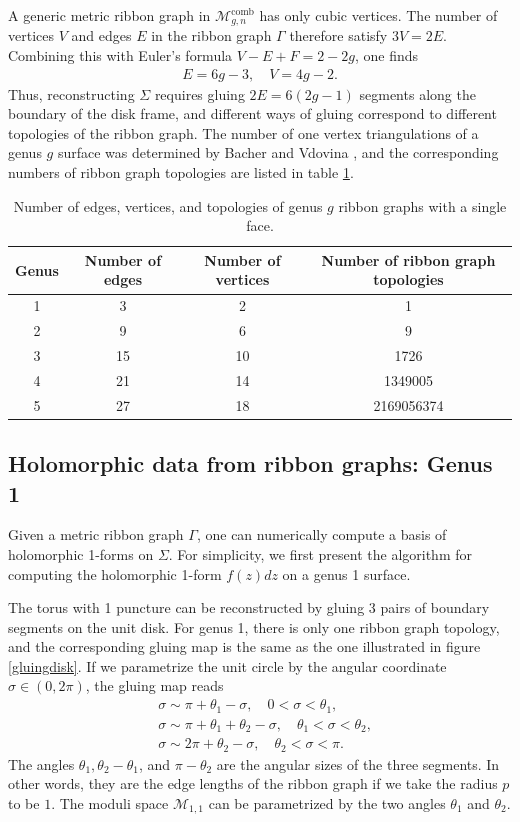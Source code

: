 \documentclass[12pt]{article}
\def\ie{\begin{equation}\begin{aligned}}
\def\fe{\end{aligned}\end{equation}}
\numberwithin{equation}{section}
\begin{document}
A generic metric ribbon graph in $\mathcal{M}_{g,n}^{\text{comb}}$ has only cubic vertices. The number of vertices $V$ and edges $E$ in the ribbon graph $\Gamma$ therefore satisfy $3V=2E$. Combining this with Euler's formula $V-E+F=2-2g$, one finds
\ie E=6g-3,\quad V=4g-2.\fe 
Thus, reconstructing $\Sigma$ requires gluing $2E=6(2g-1)$ segments along the boundary of the disk frame, and different ways of gluing correspond to different topologies of the ribbon graph. The number of one vertex triangulations of a genus $g$ surface was determined by Bacher and Vdovina \cite{BACHER200213}, and the corresponding numbers of ribbon graph topologies are listed in table \ref{topologynumber}. 

\begin{table}
\begin{center}
\begin{tabular}{cccc}
\hline
Genus & Number of edges & Number of vertices & Number of ribbon graph topologies \\ \hline
1     & 3 & 2 & 1                                 \\
2     & 9 & 6 & 9                                 \\
3     & 15 & 10 & 1726                              \\
4     & 21 & 14 & 1349005                           \\
5     & 27 & 18 & 2169056374                        \\ \hline
\end{tabular}
\end{center}
\caption{Number of edges, vertices, and topologies of genus $g$ ribbon graphs with a single face.}
\label{topologynumber}
\end{table}

\subsection{Holomorphic data from ribbon graphs: Genus 1}

Given a metric ribbon graph $\Gamma$, one can numerically compute a basis of holomorphic 1-forms on $\Sigma$. For simplicity, we first present the algorithm for computing the holomorphic 1-form $f(z)dz$ on a genus 1 surface.

The torus with 1 puncture can be reconstructed by gluing 3 pairs of boundary segments on the unit disk. For genus 1, there is only one ribbon graph topology, and the corresponding gluing map is the same as the one illustrated in figure \ref{gluingdisk}. If we parametrize the unit circle by the angular coordinate $\sigma \in (0,2\pi)$, the gluing map reads
\ie
&\sigma \sim \pi + \theta_1 - \sigma, \quad 0<\sigma<\theta_1,\\
&\sigma \sim \pi + \theta_1 + \theta_2 - \sigma, \quad \theta_1 <\sigma<\theta_2,\\
&\sigma \sim 2\pi + \theta_2 - \sigma,\quad \theta_2 < \sigma < \pi.
\label{gluinggenus1}
\fe
The angles $\theta_{1}, \theta_2-\theta_1$, and $\pi-\theta_2$ are the angular sizes of the three segments. In other words, they are the edge lengths of the ribbon graph if we take the radius $p$ to be $1$. The moduli space $\mathcal{M}_{1,1}$ can be parametrized by the two angles $\theta_1$ and $\theta_2$.
\end{document}
